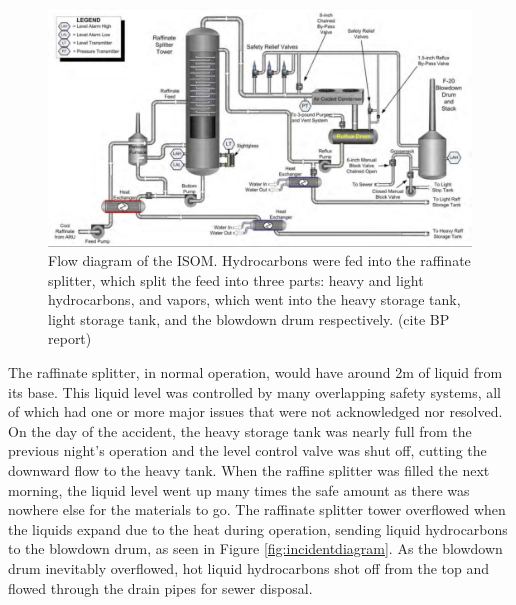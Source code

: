 \documentclass[12pt]{article}
\begin{document}
	\begin{figure}[H]

		\includegraphics[width=\textwidth]{BP_Texas_City_ISOM_unit.png}
		\caption{Flow diagram of the ISOM. Hydrocarbons were fed into the raffinate splitter, which split the feed into three parts: heavy and light hydrocarbons, and vapors, which went into the heavy storage tank, light storage tank, and the blowdown drum respectively. (cite BP report)}
		\label{fig:ISOMunit}
	\end{figure}
	
	The raffinate splitter, in normal operation, would have around 2m of liquid from its base. This liquid level was controlled by many overlapping safety systems, all of which had one or more major issues that were not acknowledged nor resolved. On the day of the accident, the heavy storage tank was nearly full from the previous night's operation and the level control valve was shut off, cutting the downward flow to the heavy tank. When the raffine splitter was filled the next morning, the liquid level went up many times the safe amount as there was nowhere else for the materials to go. The raffinate splitter tower overflowed when the liquids expand due to the heat during operation, sending liquid hydrocarbons to the blowdown drum, as seen in Figure \ref{fig:incidentdiagram}. As the blowdown drum inevitably overflowed, hot liquid hydrocarbons shot off from the top and flowed through the drain pipes for sewer disposal.
	
\end{document}
